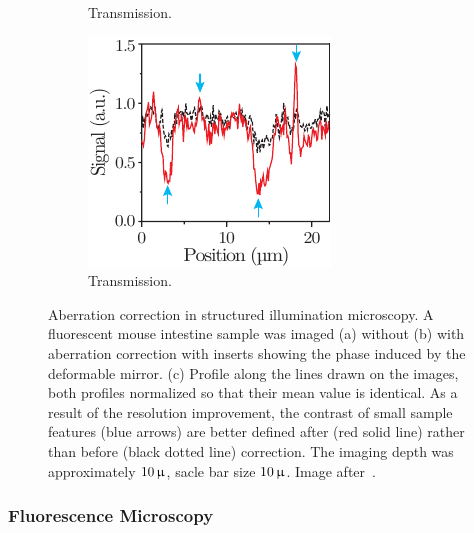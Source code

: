 \begin{figure}[tbh]
\begin{subfigure}[b]{0.3\textwidth}
                \caption{Transmission.}
                \label{fig:SI_corrected}
        \end{subfigure}
        \begin{subfigure}[b]{0.3\textwidth}
                \includegraphics[width=\textwidth]{images/structured_illumination_scan}
                \caption{Transmission.}
                \label{fig:SI_scan}
        \end{subfigure}
								
        \caption{Aberration correction in structured illumination microscopy. A fluorescent mouse intestine sample was imaged (a) without (b) with aberration correction with inserts showing the phase induced by the deformable mirror. (c) Profile along the lines drawn on the images, both profiles normalized so that their mean value is identical. As a result of the resolution improvement, the contrast of small sample features (blue arrows) are better defined after (red solid line) rather than before (black dotted line) correction. The imaging depth was approximately $\unit[10]{\upmu}$, sacle bar size $\unit[10]{\upmu}$. Image after~\cite{wide_AOM_structured_illu}.}
\label{fig:structured_light_correction}
\end{figure} 

\subsubsection{Fluorescence Microscopy}
\label{sec:FlourescnecMicroscopy}

